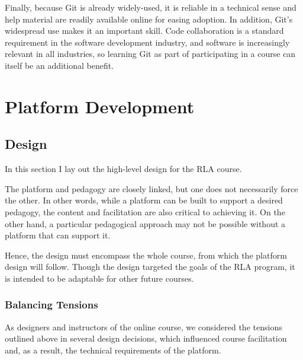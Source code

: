 \documentclass[12pt,twoside]{mitthesis}
\begin{document}
Finally, because Git is already widely-used, it is reliable in a technical sense and help material are readily available online for easing adoption. In addition, Git's widespread use makes it an important skill. Code collaboration is a standard requirement in the software development industry, and software is increasingly relevant in all industries, so learning Git as part of participating in a course can itself be an additional benefit.~\cite{haaranen2015teaching}

\chapter{Platform Development}

\section{Design}

In this section I lay out the high-level design for the RLA course. 

The platform and pedagogy are closely linked, but one does not necessarily force the other. In other words, while a platform can be built to support a desired pedagogy, the content and facilitation are also critical to achieving it. On the other hand, a particular pedagogical approach may not be possible without a platform that can support it. 

Hence, the design must encompass the whole course, from which the platform design will follow. Though the design targeted the goals of the RLA program, it is intended to be adaptable for other future courses.

\subsection{Balancing Tensions}

As designers and instructors of the online course, we considered the tensions outlined above in several design decisions, which influenced course facilitation and, as a result, the technical requirements of the platform.
\end{document}

